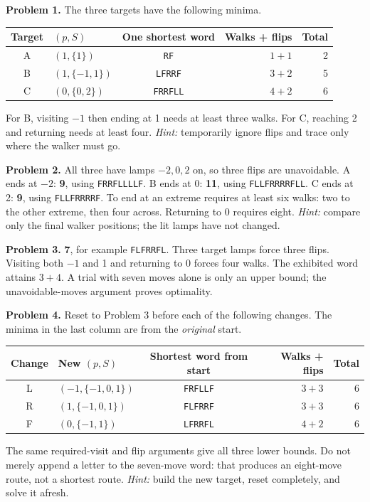 \documentclass[11pt,letterpaper]{article}
\newcommand{\word}[1]{\texttt{#1}}
\begin{document}
\textbf{Problem 1.} The three targets have the following minima.
\begin{center}\renewcommand{\arraystretch}{1.2}
\begin{tabular}{@{}clcrr@{}}\toprule
Target & $(p,S)$ & One shortest word & Walks + flips & Total\\\midrule
A & $(1,\{1\})$ & \word{RF} & $1+1$ & 2\\
B & $(1,\{-1,1\})$ & \word{LFRRF} & $3+2$ & 5\\
C & $(0,\{0,2\})$ & \word{FRRFLL} & $4+2$ & 6\\\bottomrule
\end{tabular}\end{center}
For B, visiting $-1$ then ending at 1 needs at least three walks. For C, reaching 2 and returning needs at least four. \emph{Hint:} temporarily ignore flips and trace only where the walker must go.

\textbf{Problem 2.} All three have lamps $-2,0,2$ on, so three flips are unavoidable. A ends at $-2$: \textbf{9}, using \word{FRRFLLLLF}. B ends at 0: \textbf{11}, using \word{FLLFRRRRFLL}. C ends at 2: \textbf{9}, using \word{FLLFRRRRF}. To end at an extreme requires at least six walks: two to the other extreme, then four across. Returning to 0 requires eight. \emph{Hint:} compare only the final walker positions; the lit lamps have not changed.

\textbf{Problem 3.} \textbf{7}, for example \word{FLFRRFL}. Three target lamps force three flips. Visiting both $-1$ and 1 and returning to 0 forces four walks. The exhibited word attains $3+4$. A trial with seven moves alone is only an upper bound; the unavoidable-moves argument proves optimality.

\textbf{Problem 4.} Reset to Problem 3 before each of the following changes. The minima in the last column are from the \emph{original} start.
\begin{center}\renewcommand{\arraystretch}{1.2}
\begin{tabular}{@{}clcrr@{}}\toprule
Change & New $(p,S)$ & Shortest word from start & Walks + flips & Total\\\midrule
L & $(-1,\{-1,0,1\})$ & \word{FRFLLF} & $3+3$ & 6\\
R & $(1,\{-1,0,1\})$ & \word{FLFRRF} & $3+3$ & 6\\
F & $(0,\{-1,1\})$ & \word{LFRRFL} & $4+2$ & 6\\\bottomrule
\end{tabular}\end{center}
The same required-visit and flip arguments give all three lower bounds. Do not merely append a letter to the seven-move word: that produces an eight-move route, not a shortest route. \emph{Hint:} build the new target, reset completely, and solve it afresh.
\end{document}
